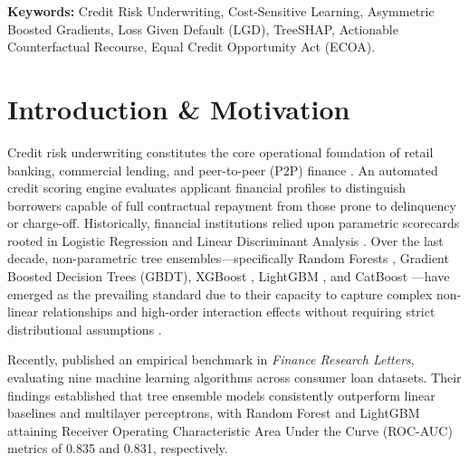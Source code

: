 \documentclass[11pt,a4paper]{article}
\begin{document}
\textbf{Keywords:} Credit Risk Underwriting, Cost-Sensitive Learning, Asymmetric Boosted Gradients, Loss Given Default (LGD), TreeSHAP, Actionable Counterfactual Recourse, Equal Credit Opportunity Act (ECOA).

\newpage

\section{Introduction \& Motivation}
Credit risk underwriting constitutes the core operational foundation of retail banking, commercial lending, and peer-to-peer (P2P) finance \citep{hand1997statistical, thomas2000survey}. An automated credit scoring engine evaluates applicant financial profiles to distinguish borrowers capable of full contractual repayment from those prone to delinquency or charge-off. Historically, financial institutions relied upon parametric scorecards rooted in Logistic Regression and Linear Discriminant Analysis \citep{baesens2003benchmarking}. Over the last decade, non-parametric tree ensembles---specifically Random Forests \citep{breiman2001random}, Gradient Boosted Decision Trees (GBDT), XGBoost \citep{chen2016xgboost}, LightGBM \citep{ke2017lightgbm}, and CatBoost \citep{prokhorenkova2018catboost}---have emerged as the prevailing standard due to their capacity to capture complex non-linear relationships and high-order interaction effects without requiring strict distributional assumptions \citep{lessmann2015benchmarking, xia2020credit}.

Recently, \citet{li2024evaluating} published an empirical benchmark in \textit{Finance Research Letters}, evaluating nine machine learning algorithms across consumer loan datasets. Their findings established that tree ensemble models consistently outperform linear baselines and multilayer perceptrons, with Random Forest and LightGBM attaining Receiver Operating Characteristic Area Under the Curve (ROC-AUC) metrics of 0.835 and 0.831, respectively.
\end{document}

